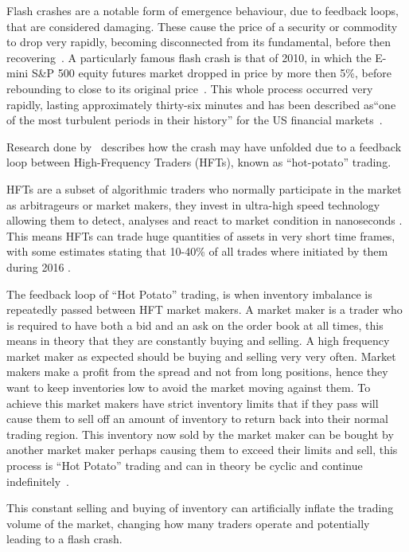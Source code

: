 \documentclass{article}
\begin{document}
Flash crashes are a notable form of emergence behaviour, due to feedback loops, that are considered damaging. These cause the price of a security or commodity to drop very rapidly, becoming disconnected from its fundamental, before then recovering~\cite{rareeventflashcrash}. A particularly famous flash crash is that of 2010, in which the E-mini S\&P 500 equity futures market dropped in price by more then 5\%, before rebounding to close to its original price~\cite{SECreport_delays, rareeventflashcrash}. This whole process occurred very rapidly, lasting approximately thirty-six minutes and has been described as``one of the most turbulent periods in their history'' for the US financial markets~\cite{Impact_hft}.

Research done by~\cite{DynamicCoupling_Chris, otherabmflash} describes how the crash may have unfolded due to a feedback loop between High-Frequency Traders (HFTs), known as ``hot-potato'' trading.

HFTs are a subset of algorithmic traders who normally participate in the market as arbitrageurs or market makers, they invest in ultra-high speed technology allowing them to detect, analyses and react to market condition in nanoseconds \cite{hftinformation1}. This means HFTs can trade huge quantities of assets in very short time frames, with some estimates stating that 10-40\% of all trades where initiated by them during 2016 \cite{hftmarketparticipation}.

The feedback loop of ``Hot Potato'' trading, is when inventory imbalance is repeatedly passed between HFT market makers. A market maker is a trader who is required to have both a bid and an ask on the order book at all times, this means in theory that they are constantly buying and selling. A high frequency market maker as expected should be buying and selling very very often. Market makers make a profit from the spread and not from long positions, hence they want to keep inventories low to avoid the market moving against them. To achieve this market makers have strict inventory limits that if they pass will cause them to sell off an amount of inventory to return back into their normal trading region. This inventory now sold by the market maker can be bought by another market maker perhaps causing them to exceed their limits and sell, this process is ``Hot Potato'' trading and can in theory be cyclic and continue indefinitely~\cite{Elias_Paper}.

This constant selling and buying of inventory can artificially inflate the trading volume of the market, changing how many traders operate and potentially leading to a flash crash.
\end{document}
